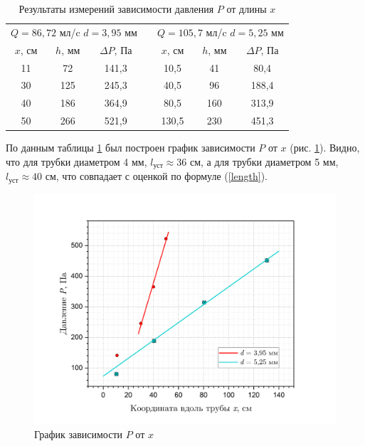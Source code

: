 \documentclass[a4paper, 12pt]{article}
\begin{document}
    \begin{table}[H]
        \centering
        \begin{tabular}{|ccc|c|ccc|}
            \cline{1-3} \cline{5-7}
            \multicolumn{3}{|c|}{$Q = 86,72$ мл/c $d = 3,95$ мм} & \multirow{6}{*}{} & \multicolumn{3}{c|}{$Q = 105,7$ мл/c $d = 5,25$ мм} \\ \cline{1-3} \cline{5-7} 
            \multicolumn{1}{|c|}{$x$, см} & \multicolumn{1}{c|}{$h$, мм} & $\Delta P$, Па &  & \multicolumn{1}{c|}{$x$, см} & \multicolumn{1}{c|}{$h$, мм} & $\Delta P$, Па \\ \cline{1-3} \cline{5-7} 
            \multicolumn{1}{|c|}{11} & \multicolumn{1}{c|}{72} & 141,3 &  & \multicolumn{1}{c|}{10,5} & \multicolumn{1}{c|}{41} & 80,4 \\ \cline{1-3} \cline{5-7} 
            \multicolumn{1}{|c|}{30} & \multicolumn{1}{c|}{125} & 245,3 &  & \multicolumn{1}{c|}{40,5} & \multicolumn{1}{c|}{96} & 188,4 \\ \cline{1-3} \cline{5-7} 
            \multicolumn{1}{|c|}{40} & \multicolumn{1}{c|}{186} & 364,9 &  & \multicolumn{1}{c|}{80,5} & \multicolumn{1}{c|}{160} & 313,9 \\ \cline{1-3} \cline{5-7} 
            \multicolumn{1}{|c|}{50} & \multicolumn{1}{c|}{266} & 521,9 &  & \multicolumn{1}{c|}{130,5} & \multicolumn{1}{c|}{230} & 451,3 \\ \cline{1-3} \cline{5-7} 
        \end{tabular}
        \caption{Результаты измерений зависимости давления $P$ от длины $x$}
        \label{P(x)}
    \end{table}

    \noindent По данным таблицы \ref{P(x)} был построен график зависимости $P$ от $x$ (рис. \ref{graph_P(x)}). Видно, что для трубки диаметром 4 мм, $l_\text{уст} \approx 36$ см, а для трубки диаметром 5 мм, $l_\text{уст} \approx 40$ см, что совпадает с оценкой по формуле (\ref{length}).

     \begin{figure}[H]
        \centering
        \includegraphics[width = 15cm]{images/P(x).png}
        \caption{График зависимости $P$ от $x$}
        \label{graph_P(x)}
    \end{figure}
    
\end{document}
